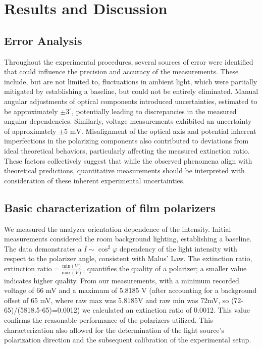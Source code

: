 \documentclass[12pt,a4paper]{article}
\begin{document}
\section{Results and Discussion}

\subsection{Error Analysis}
Throughout the experimental procedures, several sources of error were identified that could influence the precision and accuracy of the measurements. These include, but are not limited to, fluctuations in ambient light, which were partially mitigated by establishing a baseline, but could not be entirely eliminated. Manual angular adjustments of optical components introduced uncertainties, estimated to be approximately \( \pm 3^\circ \), potentially leading to discrepancies in the measured angular dependencies. Similarly, voltage measurements exhibited an uncertainty of approximately \( \pm 5 \text{ mV} \). Misalignment of the optical axis and potential inherent imperfections in the polarizing components also contributed to deviations from ideal theoretical behaviors, particularly affecting the measured extinction ratio. These factors collectively suggest that while the observed phenomena align with theoretical predictions, quantitative measurements should be interpreted with consideration of these inherent experimental uncertainties.

\subsection{Basic characterization of film polarizers}


We measured the analyzer orientation dependence of the intensity. Initial measurements considered the room background lighting, establishing a baseline. The data demonstrates a \( I \sim \cos^2\varphi \) dependency of the light intensity with respect to the polarizer angle, consistent with Malus' Law. The extinction ratio, \( \text{extinction\_ratio} = \frac{\text{min}(V)}{\text{max}(V)} \), quantifies the quality of a polarizer; a smaller value indicates higher quality. From our measurements, with a minimum recorded voltage of 66 mV and a maximum of 5.8185 V (after accounting for a background offset of 65 mV, where raw max was 5.8185V and raw min was 72mV, so (72-65)/(5818.5-65)=0.0012) we calculated an extinction ratio of 0.0012. This value confirms the reasonable performance of the polarizers utilized. This characterization also allowed for the determination of the light source's polarization direction and the subsequent calibration of the experimental setup.
\end{document}
